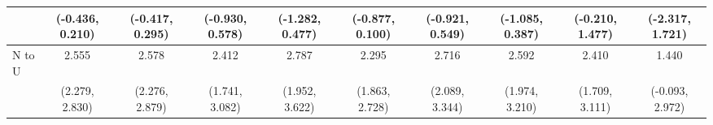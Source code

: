 {\begin{tabular}{l|c|c|c|c|c|c|c|c|c}
& {\scriptsize (-0.436, 0.210)}
& {\scriptsize (-0.417, 0.295)}
& {\scriptsize (-0.930, 0.578)}
& {\scriptsize (-1.282, 0.477)}
& {\scriptsize (-0.877, 0.100)}
& {\scriptsize (-0.921, 0.549)}
& {\scriptsize (-1.085, 0.387)}
& {\scriptsize (-0.210, 1.477)}
& {\scriptsize (-2.317, 1.721)}
\\ [0.1cm]
\hline
N to U
& 2.555 & 2.578 & 2.412 & 2.787 & 2.295 & 2.716 & 2.592 & 2.410 & 1.440 \\
& {\scriptsize (2.279, 2.830)}
& {\scriptsize (2.276, 2.879)}
& {\scriptsize (1.741, 3.082)}
& {\scriptsize (1.952, 3.622)}
& {\scriptsize (1.863, 2.728)}
& {\scriptsize (2.089, 3.344)}
& {\scriptsize (1.974, 3.210)}
& {\scriptsize (1.709, 3.111)}
& {\scriptsize (-0.093, 2.972)}
\\ [0.1cm]
\hline
\hline
\end{tabular}
}
